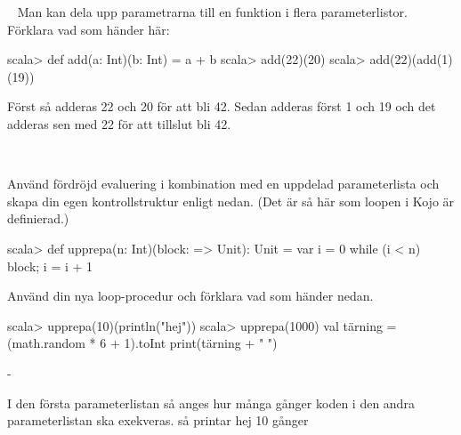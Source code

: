 \QUESTEND









\QUESTBEGIN

\Task  \what~  Man kan dela upp parametrarna till en funktion i flera parameterlistor. Förklara vad som händer här:
\begin{REPL}
scala> def add(a: Int)(b: Int) = a + b
scala> add(22)(20)
scala> add(22)(add(1)(19))
\end{REPL}


\SOLUTION


\TaskSolved \what


Först så adderas 22 och 20 för att bli 42.
Sedan adderas först 1 och 19 och det adderas sen med 22 för att tillslut bli 42.



\QUESTEND









\QUESTBEGIN

\Task  \what~

\Subtask Använd fördröjd evaluering i kombination med en uppdelad parameterlista och skapa din egen kontrollstruktur enligt nedan. (Det är så här som loopen  i Kojo är definierad.)
\begin{REPL}
scala> def upprepa(n: Int)(block: => Unit): Unit = {
         var i = 0
         while (i < n) {block; i = i + 1}
       }
\end{REPL}

\Subtask Använd din nya loop-procedur och förklara vad som händer nedan.
\begin{REPL}
scala> upprepa(10)(println("hej"))
scala> upprepa(1000){
  val tärning = (math.random * 6 + 1).toInt
  print(tärning + " ")
}
\end{REPL}



\SOLUTION


\TaskSolved \what


\SubtaskSolved  -

\SubtaskSolved  I den första parameterlistan så anges hur många gånger koden i den andra parameterlistan ska exekveras. så  printar hej 10 gånger



